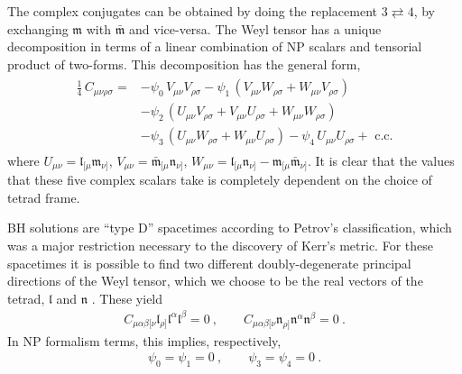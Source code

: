 The complex conjugates can be obtained by doing the replacement $3 \rightleftarrows 4$, by exchanging $\bm{\mathfrak{m}}$ with $\bar{\bm{\mathfrak{m}}}$ and vice-versa. 
The Weyl tensor has a unique decomposition in terms of a linear combination of NP scalars and tensorial product of two-forms.
This decomposition has the general form,
\begin{align}
    \begin{split}
    \frac{1}{4} \, C_{\mu\nu\rho\sigma} = & - \psi_0 \,V_{\mu\nu} V_{\rho\sigma} - \psi_1 \, (V_{\mu\nu} W_{\rho\sigma} + W_{\mu\nu} V_{\rho\sigma}) \\
    & - \psi_2 \, (U_{\mu\nu}V_{\rho\sigma} + V_{\mu\nu}U_{\rho\sigma} + W_{\mu\nu}W_{\rho\sigma}) \\
    & - \psi_3 \, (U_{\mu\nu}W_{\rho\sigma} + W_{\mu\nu}U_{\rho\sigma})
    - \psi_4 \, U_{\mu\nu}U_{\rho\sigma} + \text{ c.c.}
    \end{split}
\end{align}
where $U_{\mu\nu} = \mathfrak{l}_{[\mu} \mathfrak{m}_{\nu]}$, $V_{\mu\nu} = \bar{\mathfrak{m}}_{[\mu} \mathfrak{n}_{\nu]}$, $W_{\mu\nu} = \mathfrak{l}_{[\mu} \mathfrak{n}_{\nu]} - \mathfrak{m}_{[\mu} \bar{\mathfrak{m}}_{\nu]}$.
It is clear that the values that these five complex scalars take is completely dependent on the choice of tetrad frame. 

BH solutions are ``type D'' spacetimes according to Petrov's classification, which was a major restriction necessary to the discovery of Kerr's metric.
For these spacetimes it is possible to find two different doubly-degenerate principal directions of the Weyl tensor, which we choose to be the real vectors of the tetrad, $\bm{\mathfrak{l}}$ and $\bm{\mathfrak{n}}$ \cite{Chandrasekhar1998}.
These yield
\begin{align}
    C_{\mu\alpha\beta[\nu} \mathfrak{l}_{\rho]} \mathfrak{l}^\alpha \mathfrak{l}^\beta = 0 ~, \qquad C_{\mu\alpha\beta[\nu} \mathfrak{n}_{\rho]} \mathfrak{n}^\alpha \mathfrak{n}^\beta = 0  ~.
\end{align}
In NP formalism terms, this implies, respectively,
\begin{align}
    \psi_0=\psi_1=0 ~,\qquad \psi_3=\psi_4=0 ~.
\end{align}

